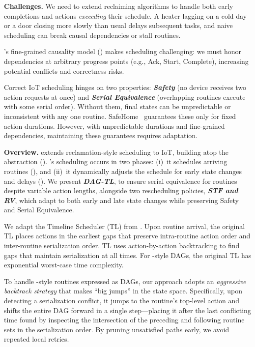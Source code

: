 \noindent\textbf{Challenges.} 
We need to extend reclaiming algorithms to handle both early completions and 
actions \textit{exceeding} their schedule. 
A heater lagging on a cold day or a door closing more slowly than usual delays subsequent tasks, and naive scheduling
can break causal dependencies or stall routines. 

\sysname's fine-grained causality model () makes scheduling challenging:
we must honor dependencies at arbitrary progress points (e.g., Ack, Start, Complete), increasing potential conflicts and correctness risks.

Correct IoT scheduling hinges on two properties: \textbf{\textit{Safety}} (no device receives two action requests at once) and \textbf{\textit{Serial Equivalence}} (overlapping routines execute with some serial order). Without them, final states can be unpredictable or inconsistent with any one routine. SafeHome~\cite{SafeHomeEuroSys2021} guarantees these only for fixed action durations.
However, with unpredictable durations and fine-grained dependencies, maintaining these guarantees requires adaptation.

\noindent\textbf{Overview.} 
\sysname{} extends reclamation-style scheduling to IoT,
building atop the \abs{} abstraction ().
\sysname's scheduling occurs in two phases: 
(i)~it schedules arriving routines (), and
(ii)~it dynamically adjusts the schedule for early state changes and delays (). 
We present \textbf{\textit{DAG-TL}}, to ensure serial equivalence for routines despite variable action lengths, 
alongside two rescheduling policies, \textbf{\textit{STF and RV}}, which 
adapt to both early and late state changes while preserving
Safety and Serial Equivalence.


\label{rasc:sec:scheduler}

We adapt the Timeline Scheduler (TL) from \cite{SafeHomeEuroSys2021}. 
Upon routine arrival, the original TL places actions in the earliest gaps that preserve 
intra-routine action order and inter-routine serialization order.
TL uses action-by-action backtracking to find gaps that
maintain serialization at all times.
For \sysname-style DAGs, the original TL has exponential worst-case time complexity. 

To handle \sysname-style routines expressed as DAGs, our {\it \scheduler} approach 
adopts an {\it aggressive backtrack strategy} that makes ``big jumps'' in the state space.
Specifically, upon detecting a serialization conflict, it jumps to the routine's top-level action and shifts the entire DAG forward in a single step---placing it after the last conflicting time found by inspecting the intersection of the preceding and following routine sets in the serialization order. By pruning unsatisfied paths early, we avoid repeated local retries.

